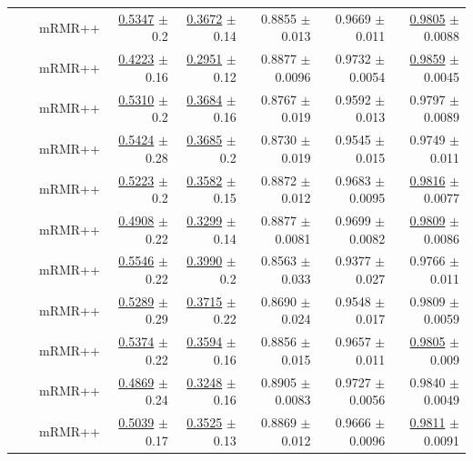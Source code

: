 \begin{longtable}{llp{}rrrrr}
 &  & mRMR++ & \underline{0.5347} {\scriptsize $\pm$ 0.2} & \underline{0.3672} {\scriptsize $\pm$ 0.14} & 0.8855 {\scriptsize $\pm$ 0.013} & 0.9669 {\scriptsize $\pm$ 0.011} & \underline{0.9805} {\scriptsize $\pm$ 0.0088} \\
 &  & mRMR++ & \underline{0.4223} {\scriptsize $\pm$ 0.16} & \underline{0.2951} {\scriptsize $\pm$ 0.12} & 0.8877 {\scriptsize $\pm$ 0.0096} & 0.9732 {\scriptsize $\pm$ 0.0054} & \underline{0.9859} {\scriptsize $\pm$ 0.0045} \\
 &  & mRMR++ & \underline{0.5310} {\scriptsize $\pm$ 0.2} & \underline{0.3684} {\scriptsize $\pm$ 0.16} & 0.8767 {\scriptsize $\pm$ 0.019} & 0.9592 {\scriptsize $\pm$ 0.013} & 0.9797 {\scriptsize $\pm$ 0.0089} \\
 &  & mRMR++ & \underline{0.5424} {\scriptsize $\pm$ 0.28} & \underline{0.3685} {\scriptsize $\pm$ 0.2} & 0.8730 {\scriptsize $\pm$ 0.019} & 0.9545 {\scriptsize $\pm$ 0.015} & 0.9749 {\scriptsize $\pm$ 0.011} \\
 &  & mRMR++ & \underline{0.5223} {\scriptsize $\pm$ 0.2} & \underline{0.3582} {\scriptsize $\pm$ 0.15} & 0.8872 {\scriptsize $\pm$ 0.012} & 0.9683 {\scriptsize $\pm$ 0.0095} & \underline{0.9816} {\scriptsize $\pm$ 0.0077} \\
 &  & mRMR++ & \underline{0.4908} {\scriptsize $\pm$ 0.22} & \underline{0.3299} {\scriptsize $\pm$ 0.14} & 0.8877 {\scriptsize $\pm$ 0.0081} & 0.9699 {\scriptsize $\pm$ 0.0082} & \underline{0.9809} {\scriptsize $\pm$ 0.0086} \\
 &  & mRMR++ & \underline{0.5546} {\scriptsize $\pm$ 0.22} & \underline{0.3990} {\scriptsize $\pm$ 0.2} & 0.8563 {\scriptsize $\pm$ 0.033} & 0.9377 {\scriptsize $\pm$ 0.027} & 0.9766 {\scriptsize $\pm$ 0.011} \\
 &  & mRMR++ & \underline{0.5289} {\scriptsize $\pm$ 0.29} & \underline{0.3715} {\scriptsize $\pm$ 0.22} & 0.8690 {\scriptsize $\pm$ 0.024} & 0.9548 {\scriptsize $\pm$ 0.017} & 0.9809 {\scriptsize $\pm$ 0.0059} \\
 &  & mRMR++ & \underline{0.5374} {\scriptsize $\pm$ 0.22} & \underline{0.3594} {\scriptsize $\pm$ 0.16} & 0.8856 {\scriptsize $\pm$ 0.015} & 0.9657 {\scriptsize $\pm$ 0.011} & \underline{0.9805} {\scriptsize $\pm$ 0.009} \\
 &  & mRMR++ & \underline{0.4869} {\scriptsize $\pm$ 0.24} & \underline{0.3248} {\scriptsize $\pm$ 0.16} & 0.8905 {\scriptsize $\pm$ 0.0083} & 0.9727 {\scriptsize $\pm$ 0.0056} & 0.9840 {\scriptsize $\pm$ 0.0049} \\
 &  & mRMR++ & \underline{0.5039} {\scriptsize $\pm$ 0.17} & \underline{0.3525} {\scriptsize $\pm$ 0.13} & 0.8869 {\scriptsize $\pm$ 0.012} & 0.9666 {\scriptsize $\pm$ 0.0096} & \underline{0.9811} {\scriptsize $\pm$ 0.0091} \\

\end{longtable}
